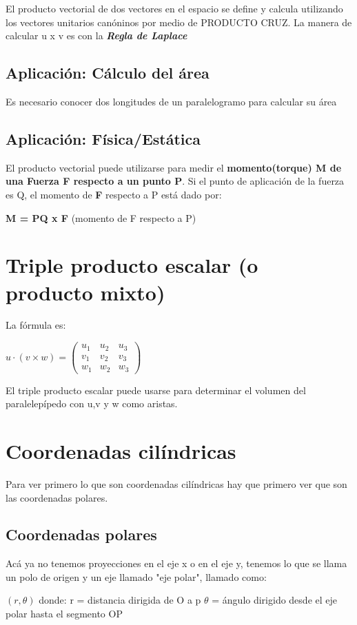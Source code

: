 \documentclass[letterpaper,12pt]{article}
\begin{document}
\begin{sloppypar}
\noindent El producto vectorial de dos vectores en el espacio se define y calcula utilizando los vectores unitarios canóninos por medio de PRODUCTO CRUZ. La manera de calcular u x v es con la \textbf{\textit{Regla de Laplace}}

\subsection{Aplicación: Cálculo del área}
Es necesario conocer dos longitudes de un paralelogramo para calcular su área

\subsection{Aplicación: Física/Estática}
El producto vectorial puede utilizarse para medir el \textbf{momento(torque) M de una Fuerza F respecto a un punto P}. Si el punto de aplicación de la fuerza es Q, el momento de \textbf{F} respecto a P está dado por:

\begin{center}
    \textbf{M = PQ x F} (momento de F respecto a P)
\end{center}
\section{Triple producto escalar (o producto mixto)}
\noindent La fórmula es:

\begin{center}
    $u \cdot (v \times  w) = \begin{pmatrix}
        u_1 & u_2 & u_3\\ 
        v_1 & v_2 & v_3\\ 
        w_1 & w_2 & w_3
    \end{pmatrix}$
\end{center}
\noindent El triple producto escalar puede usarse para determinar el volumen del paralelepípedo con u,v y w como aristas. 
\section{Coordenadas cilíndricas}
Para ver primero lo que son coordenadas cilíndricas hay que primero ver que son las coordenadas polares.
\subsection{Coordenadas polares}
Acá ya no tenemos proyecciones en el eje x o en el eje y, tenemos lo que se llama un polo de origen y un eje llamado "eje polar", llamado como:
\begin{center}
    \textbf{$(r, \theta)$} donde:
    r = distancia dirigida de O a p
    $\theta$ = ángulo dirigido desde el eje polar hasta el segmento OP


\end{center}
\end{sloppypar}
\end{document}
